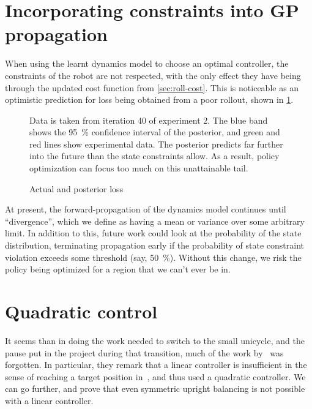 \documentclass[main.tex]{subfiles}
\begin{document}
\section{Incorporating constraints into GP propagation}

	When using the learnt dynamics model to choose an optimal controller, the constraints of the robot are not respected, with the only effect they have being through the updated cost function from \cref{sec:roll-cost}.
	This is noticeable as an optimistic prediction for loss being obtained from a poor rollout, shown in \cref{fig:loss-prediction}.
	\begin{figure}[b!]
		\begin{minipage}{\linewidth/2-2em}
			
		\end{minipage}\hfill%
		\begin{minipage}{\linewidth/2-2em}
			\caption{Actual and posterior loss}
			\label{fig:loss-prediction}
			\small
			\medskip
			Data is taken from iteration 40 of experiment 2.
			The blue band shows the \SI{95}{\percent} confidence interval of the posterior, and green and red lines show experimental data.
			The posterior predicts far further into the future than the state constraints allow.
			As a result, policy optimization can focus too much on this unattainable tail.
		\end{minipage}
	\end{figure}
	At present, the forward-propagation of the dynamics model continues until \enquote{divergence}, which we define as having a mean or variance over some arbitrary limit.
	In addition to this, future work could look at the probability of the state distribution, terminating propagation early if the probability of state constraint violation exceeds some threshold (say, \SI{50}{\percent}).
	Without this change, we risk the policy being optimized for a region that we can't ever be in.

\section{Quadratic control}

	It seems than in doing the work needed to switch to the small unicycle, and the pause put in the project during that transition, much of the work by~\citeauthor{queiro} was forgotten.
	In particular, they remark that a linear controller is insufficient in the sense of reaching a target position in~\cite[fig.~8]{queiro}, and thus used a quadratic controller.
	We can go further, and prove that even symmetric upright balancing is not possible with a linear controller.
\end{document}
